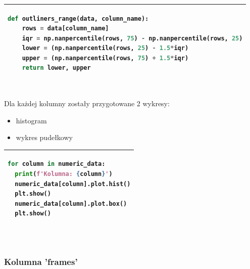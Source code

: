 \documentclass[11pt, a4paper]{article}
\begin{document}
    \begin{tabular}{|l|}
        \hline
        \begin{lstlisting}[language=Python]
def outliners_range(data, column_name):
    rows = data[column_name]
    iqr = np.nanpercentile(rows, 75) - np.nanpercentile(rows, 25)
    lower = (np.nanpercentile(rows, 25) - 1.5*iqr)
    upper = (np.nanpercentile(rows, 75) + 1.5*iqr) 
    return lower, upper
        \end{lstlisting}
        \\ \hline
    \end{tabular}
    \vspace{0.5cm} \\
    
    Dla każdej kolumny zostały przygotowane 2 wykresy:\par
    \begin{itemize}
        \item histogram
        \item wykres pudełkowy
    \end{itemize}\par
    
    \begin{tabular}{|l|}
        \hline
        \begin{lstlisting}[language=Python]
for column in numeric_data:
  print(f'Kolumna: {column}')
  numeric_data[column].plot.hist()
  plt.show()
  numeric_data[column].plot.box()
  plt.show()
        \end{lstlisting}
        \\ \hline
    \end{tabular}
    \vspace{0.5cm} \\
    
    \newpage
    \subsubsection{Kolumna 'frames'}
    
\end{document}

